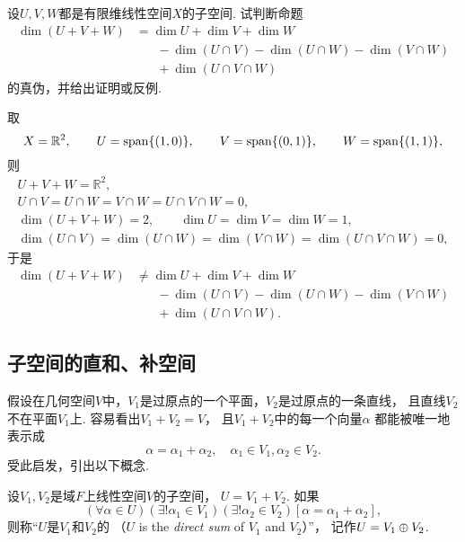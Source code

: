 \begin{example}
设\(U,V,W\)都是有限维线性空间\(X\)的子空间.
试判断命题\begin{align*}
	\dim(U+V+W)
	&= \dim U + \dim V + \dim W \\
	&\hspace{20pt} - \dim(U \cap V) - \dim (U \cap W) - \dim(V \cap W) \\
	&\hspace{20pt} + \dim(U \cap V \cap W)
\end{align*}
的真伪，并给出证明或反例.
\begin{solution}
取\[
	X = \mathbb{R}^2,
	\qquad
	U = \operatorname{span}\{(1,0)\},
	\qquad
	V = \operatorname{span}\{(0,1)\},
	\qquad
	W = \operatorname{span}\{(1,1)\},
\]
则\begin{gather*}
	U + V + W = \mathbb{R}^2, \\
	U \cap V
	= U \cap W
	= V \cap W
	= U \cap V \cap W
	= 0, \\
	\dim(U + V + W) = 2,
	\qquad
	\dim U = \dim V = \dim W = 1, \\
	\dim(U \cap V)
	= \dim(U \cap W)
	= \dim(V \cap W)
	= \dim(U \cap V \cap W)
	= 0,
\end{gather*}
于是\begin{align*}
	\dim(U+V+W)
	&\neq \dim U + \dim V + \dim W \\
	&\hspace{20pt} - \dim(U \cap V) - \dim (U \cap W) - \dim(V \cap W) \\
	&\hspace{20pt} + \dim(U \cap V \cap W).
\end{align*}
\end{solution}
\end{example}

\subsection{子空间的直和、补空间}
假设在几何空间\(V\)中，\(V_1\)是过原点的一个平面，\(V_2\)是过原点的一条直线，
且直线\(V_2\)不在平面\(V_1\)上.
容易看出\(V_1 + V_2 = V\)，
且\(V_1 + V_2\)中的每一个向量\(\alpha\)
都能被唯一地表示成\[
	\alpha = \alpha_1 + \alpha_2,
	\quad
	\alpha_1 \in V_1,
	\alpha_2 \in V_2.
\]
受此启发，引出以下概念.
\begin{definition}
设\(V_1,V_2\)是域\(F\)上线性空间\(V\)的子空间，
\(U = V_1 + V_2\).
如果\[
	(\forall\alpha\in U)
	(\exists!\alpha_1\in V_1)
	(\exists!\alpha_2\in V_2)
	[\alpha=\alpha_1+\alpha_2],
\]
则称“\(U\)是\(V_1\)和\(V_2\)的%
（\(U\) is the \emph{direct sum} of \(V_1\) and \(V_2\)）”，
记作\(U = V_1 \oplus V_2\).
\end{definition}

